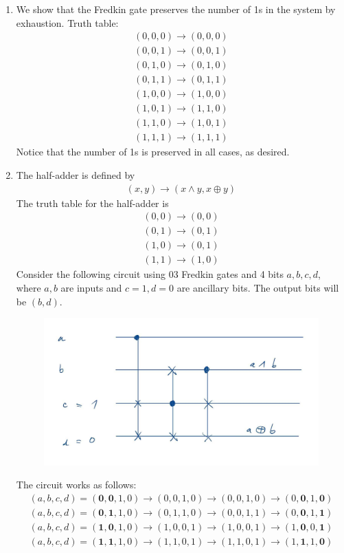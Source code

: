 \documentclass{article}
\theoremstyle{definition}
\begin{document}
\begin{enumerate}[label=(\alph*)]
	\item We show that the Fredkin gate preserves the number of 1s in the system by exhaustion. Truth table:
	\begin{align*}
		(0,0,0) \to (0,0,0)\\
		(0,0,1) \to (0,0,1)\\
		(0,1,0) \to (0,1,0)\\
		(0,1,1) \to (0,1,1)\\
		(1,0,0) \to (1,0,0)\\
		(1,0,1) \to (1,1,0)\\
		(1,1,0) \to (1,0,1)\\
		(1,1,1) \to (1,1,1)
	\end{align*}
	Notice that the number of 1s is preserved in all cases, as desired. 
	
	\item The half-adder is defined by 
	\begin{align*}
		(x,y) \to (x \land y, x \oplus y)
	\end{align*}
	The truth table for the half-adder is 
	\begin{align*}
		(0,0) \to (0,0) \\
		(0,1) \to (0,1) \\
		(1,0) \to (0,1) \\
		(1,1) \to (1,0) 
	\end{align*}
	Consider the following circuit using 03 Fredkin gates and 4 bits $a,b,c,d$, where $a,b$ are inputs and $c=1,d=0$ are ancillary bits. The output bits will be $(b,d)$. 
	\begin{figure}[!htb]
		\centering
		\includegraphics[scale=0.2]{fredkin.jpg}
	\end{figure}



	The circuit works as follows:
	\begin{align*}
		(a,b,c,d) = (\mathbf{0},\mathbf{0},1,0) \to (0,0,1,0) \to (0,0,1,0) \to (0,\mathbf{0},1,\mathbf{0}) \\
		(a,b,c,d) = (\mathbf{0},\mathbf{1},1,0) \to (0,1,1,0) \to (0,0,1,1) \to (0,\mathbf{0},1,\mathbf{1}) \\
		(a,b,c,d) = (\mathbf{1},\mathbf{0},1,0) \to (1,0,0,1) \to (1,0,0,1) \to (1,\mathbf{0},0,\mathbf{1}) \\
		(a,b,c,d) = (\mathbf{1},\mathbf{1},1,0) \to (1,1,0,1) \to (1,1,0,1) \to (1,\mathbf{1},1,\mathbf{0})
	\end{align*}
	

\end{enumerate}
\end{document}

